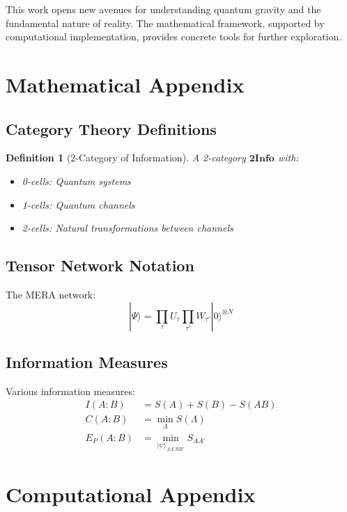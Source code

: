 \documentclass[12pt,a4paper]{article}
\newtheorem{definition}[theorem]{Definition}
\begin{document}
This work opens new avenues for understanding quantum gravity and the fundamental nature of reality. The mathematical framework, supported by computational implementation, provides concrete tools for further exploration.

\appendix

\section{Mathematical Appendix}

\subsection{Category Theory Definitions}

\begin{definition}[2-Category of Information]
A 2-category $\mathbf{2Info}$ with:
\begin{itemize}
\item 0-cells: Quantum systems
\item 1-cells: Quantum channels
\item 2-cells: Natural transformations between channels
\end{itemize}
\end{definition}

\subsection{Tensor Network Notation}

The MERA network:
\begin{equation}
|\Psi\rangle = \prod_{\tau} U_\tau \prod_{\tau'} W_{\tau'} |0\rangle^{\otimes N}
\end{equation}

\subsection{Information Measures}

Various information measures:
\begin{align}
I(A:B) &= S(A) + S(B) - S(AB) \\
C(A:B) &= \min_{\Lambda} S(\Lambda) \\
E_P(A:B) &= \min_{|\psi\rangle_{AA'BB'}} S_{AA'}
\end{align}

\section{Computational Appendix}
\end{document}
